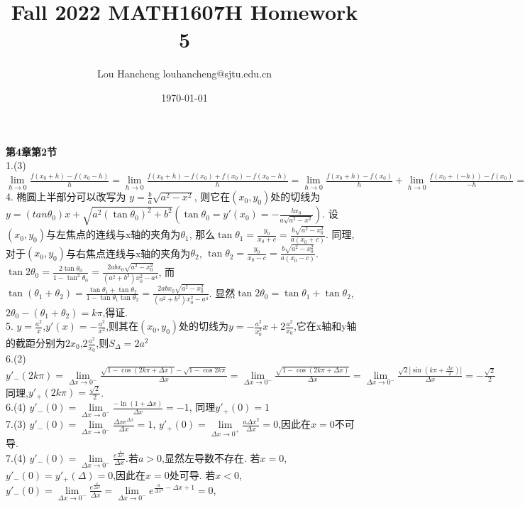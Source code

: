 \documentclass[12pt, a4paper, oneside]{ctexart}
\title{Fall 2022 MATH1607H Homework 5}
\author{Lou Hancheng \quad louhancheng@sjtu.edu.cn}
\date{\today}
\begin{document}
    \maketitle
    \thispagestyle{headings}
    \textbf{第4章第2节}\\
    1.(3) $\lim\limits_{h\to 0}\frac{f(x_0+h)-f(x_0-h)}{h}=\lim\limits_{h\to0}\frac{f(x_0+h)-f(x_0)+f(x_0)-f(x_0-h)}{h}=\lim\limits_{h\to0}\frac{f(x_0+h)-f(x_0)}{h}+\lim\limits_{h\to0}\frac{f(x_0+(-h))-f(x_0)}{-h}=2f'(x_0)$\\
    4. 椭圆上半部分可以改写为 $y=\frac ba\sqrt{a^2-x^2}$,
    则它在$(x_0,y_0)$处的切线为$y=(tan\theta_0)x+\sqrt{a^2(\tan\theta_0)^2+b^2} (\tan\theta_0=y'(x_0)=-\frac{bx_0}{a\sqrt{a^2-x^2}})$.
    设$(x_0,y_0)$与左焦点的连线与x轴的夹角为$\theta_1$,
    那么$\tan\theta_1=\frac{y_0}{x_0+c}=\frac{b\sqrt{a^2-x_0^2}}{a(x_0+c)}$.
    同理,对于$(x_0,y_0)$与右焦点连线与x轴的夹角为$\theta_2$,
    $\tan\theta_2=\frac{y_0}{x_0-c}=\frac{b\sqrt{a^2-x_0^2}}{a(x_0-c)}$.
    $\tan2\theta_0=\frac{2\tan\theta_0}{1-\tan^2\theta_0}=\frac{2abx_0\sqrt{a^2-x_0^2}}{(a^2+b^2)x_0^2-a^4}$,
    而$\tan(\theta_1+\theta_2)=\frac{\tan\theta_1+\tan\theta_2}{1-\tan\theta_1\tan\theta_2}=\frac{2abx_0\sqrt{a^2-x_0^2}}{(a^2+b^2)x_0^2-a^4}$.
    显然$\tan2\theta_0=\tan\theta_1+\tan\theta_2$,$2\theta_0-(\theta_1+\theta_2)=k\pi$,得证.\\
    5. $y=\frac{a^2}{x}$,$y'(x)=-\frac{a^2}{x^2}$,则其在$(x_0,y_0)$处的切线为$y=-\frac{a^2}{x_0^2}x+2\frac{a^2}{x_0}$,它在x轴和y轴的截距分别为$2x_0$,$2\frac{a^2}{x_0}$,则$S_{\Delta}=2a^2$\\
    6.(2) $y'_-(2k\pi)=\lim\limits_{\Delta x\to0^-}\frac{\sqrt{1-\cos(2k\pi+\Delta x)}-\sqrt{1-\cos 2k\pi}}{\Delta x}
    =\lim\limits_{\Delta x\to0^-}\frac{\sqrt{1-\cos(2k\pi+\Delta x)}}{\Delta x}
    =\lim\limits_{\Delta x\to0^-}\frac{\sqrt{2}|\sin(k\pi+\frac{\Delta x}{2})|}{\Delta x}=-\frac{\sqrt2}{2}$
    同理,$y'_+(2k\pi)=\frac{\sqrt2}{2}$.\\
    6.(4) $y'_-(0)=\lim\limits_{\Delta x\to 0^-}\frac{-\ln(1+\Delta x)}{\Delta x}=-1$,
    同理$y'_+(0)=1$\\
    7.(3) $y'_-(0)=\lim\limits_{\Delta x\to0^-}\frac{\Delta xe^{\Delta x}}{\Delta x}=1$,
    $y'_+(0)=\lim\limits_{\Delta x\to0^+}\frac{a\Delta x^2}{\Delta x}=0$,因此在$x=0$不可导.\\
    7.(4) $y'_-(0)=\lim\limits_{\Delta x\to0^-}\frac{e^{\frac{a}{\Delta x^2}}}{\Delta x}$.若$a>0$,显然左导数不存在.
    若$x=0$,$y'_-(0)=y'_+(\Delta)=0$,因此在$x=0$处可导.
    若$x<0$,$y'_-(0)=\lim\limits_{\Delta x\to0^-}\frac{e^{\frac{a}{\Delta x^2}}}{\Delta x}=\lim\limits_{\Delta x\to 0^-}e^{\frac{a}{\Delta x^2}-\Delta x+1}=0$,
\end{document}
